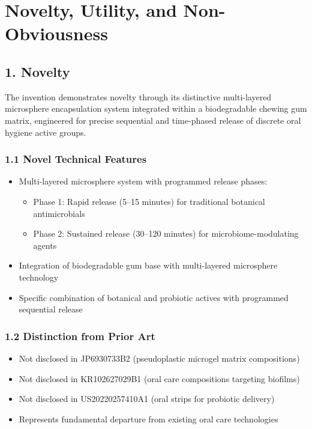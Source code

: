\documentclass[12pt]{article}
\begin{document}
\section*{Novelty, Utility, and Non-Obviousness}

\subsection*{1. Novelty}
The invention demonstrates novelty through its distinctive multi-layered microsphere encapsulation system integrated within a biodegradable chewing gum matrix, engineered for precise sequential and time-phased release of discrete oral hygiene active groups.

\subsubsection*{1.1 Novel Technical Features}
\begin{itemize}
    \item Multi-layered microsphere system with programmed release phases:
    \begin{itemize}
        \item Phase 1: Rapid release (5--15 minutes) for traditional botanical antimicrobials
        \item Phase 2: Sustained release (30--120 minutes) for microbiome-modulating agents
    \end{itemize}
    \item Integration of biodegradable gum base with multi-layered microsphere technology
    \item Specific combination of botanical and probiotic actives with programmed sequential release
\end{itemize}

\subsubsection*{1.2 Distinction from Prior Art}
\begin{itemize}
    \item Not disclosed in JP6930733B2 (pseudoplastic microgel matrix compositions)
    \item Not disclosed in KR102627029B1 (oral care compositions targeting biofilms)
    \item Not disclosed in US20220257410A1 (oral strips for probiotic delivery)
    \item Represents fundamental departure from existing oral care technologies
\end{itemize}
\end{document}
